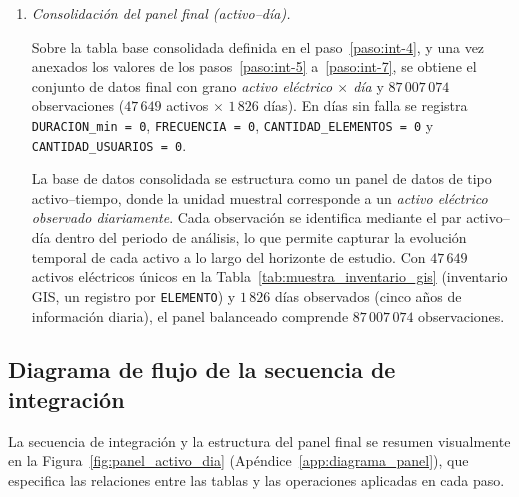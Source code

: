 {\begin{enumerate}
\begin{itemize}
        \end{itemize}
        \noindent Cuando el activo no presenta interrupciones en un día, se asigna \texttt{DURACION\_min = 0} y \texttt{FRECUENCIA = 0}. El cruce exige que \texttt{COMPONENTE\_FALLADO} coincida con \texttt{ELEMENTO} del inventario \texttt{tipo\_elemento.csv} (Tabla~\ref{tab:muestra_inventario_gis}), el cual emplea el \textit{código de sitio} georreferenciado. Cuando OMS registra el \textit{código del activo} reemplazado en lugar del código de sitio, el emparejamiento falla y el evento no se propaga al panel espacial (Sección~\ref{sec:delimitacion_temporal_modelado}).
    
        \item\label{paso:int-8} \textit{Consolidación del panel final (activo--día).}\mbox{}\par\vspace{0.2em}\noindent
        Sobre la tabla base consolidada definida en el paso~\ref{paso:int-4}, y una vez anexados los valores de los pasos~\ref{paso:int-5} a~\ref{paso:int-7}, se obtiene el conjunto de datos final con grano \textit{activo eléctrico $\times$ día} y $87\,007\,074$ observaciones ($47\,649$ activos $\times$ $1\,826$ días). En días sin falla se registra \texttt{DURACION\_min = 0}, \texttt{FRECUENCIA = 0}, \texttt{CANTIDAD\_ELEMENTOS = 0} y \texttt{CANTIDAD\_USUARIOS = 0}.
    
        La base de datos consolidada se estructura como un panel de datos de tipo activo–tiempo, donde la unidad muestral corresponde a un \textit{activo eléctrico observado diariamente}. Cada observación se identifica mediante el par activo--día dentro del periodo de análisis, lo que permite capturar la evolución temporal de cada activo a lo largo del horizonte de estudio. Con $47\,649$ activos eléctricos únicos en la Tabla~\ref{tab:muestra_inventario_gis} (inventario GIS, un registro por \texttt{ELEMENTO}) y $1\,826$ días observados (cinco años de información diaria), el panel balanceado comprende $87\,007\,074$ observaciones.
    
    
\end{enumerate}
    }
    
    
\subsection{Diagrama de flujo de la secuencia de integración}
    La secuencia de integración y la estructura del panel final se resumen visualmente en la Figura~\ref{fig:panel_activo_dia} (Apéndice~\ref{app:diagrama_panel}), que especifica las relaciones entre las tablas y las operaciones aplicadas en cada paso.

